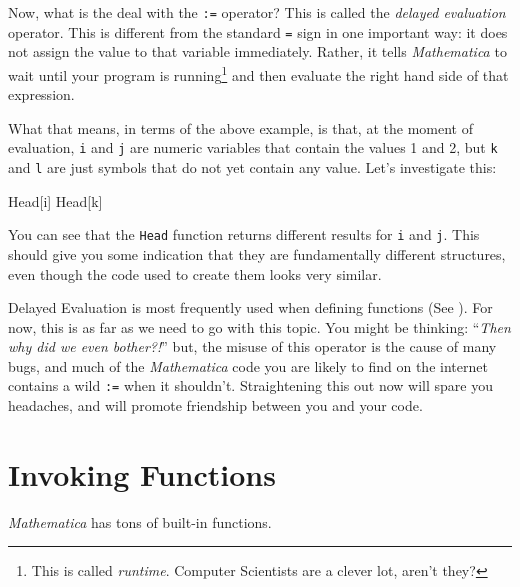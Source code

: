 Now, what is the deal with the \texttt{:=} operator? This is called the \emph{delayed evaluation} operator. This is different from the standard \texttt{=} sign in one important way: it does not assign the value to that variable immediately. Rather, it tells \emph{Mathematica} to wait until your program is running\footnote{This is called \emph{runtime}. Computer Scientists are a clever lot, aren't they?} and then evaluate the right hand side of that expression. 

What that means, in terms of the above example, is that, at the moment of evaluation, \texttt{i} and \texttt{j} are numeric variables that contain the values 1 and 2, but \texttt{k} and \texttt{l} are just symbols that do not yet contain any value. Let's investigate this:

\begin{code}
	   Head[i]
	   Head[k]
\end{code}

You can see that the \texttt{Head} function returns different results for \texttt{i} and \texttt{j}. This should give you some indication that they are fundamentally different structures, even though the code used to create them looks very similar. 

Delayed Evaluation is most frequently used when defining functions (See ). For now, this is as far as we need to go with this topic. You might be thinking: ``\emph{Then why did we even bother?!}'' but, the misuse of this operator is the cause of many bugs, and much of the \emph{Mathematica} code you are likely to find on the internet contains a wild \texttt{:=} when it shouldn't. Straightening this out now will spare you headaches, and will promote friendship between you and your code.

\section{Invoking Functions}

\emph{Mathematica} has tons of built-in functions. 
